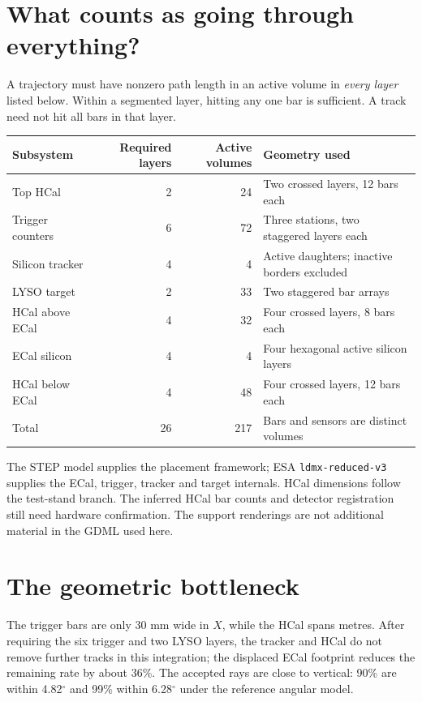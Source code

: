 \documentclass[10pt,letterpaper]{article}
\begin{document}
\section*{What counts as going through everything?}
A trajectory must have nonzero path length in an active volume in \emph{every layer} listed below. Within a segmented layer, hitting any one bar is sufficient. A track need not hit all bars in that layer.
\begin{center}
\begin{tabular}{lrrl}
\toprule
Subsystem & Required layers & Active volumes & Geometry used\\
\midrule
Top HCal & 2 & 24 & Two crossed layers, 12 bars each\\
Trigger counters & 6 & 72 & Three stations, two staggered layers each\\
Silicon tracker & 4 & 4 & Active daughters; inactive borders excluded\\
LYSO target & 2 & 33 & Two staggered bar arrays\\
HCal above ECal & 4 & 32 & Four crossed layers, 8 bars each\\
ECal silicon & 4 & 4 & Four hexagonal active silicon layers\\
HCal below ECal & 4 & 48 & Four crossed layers, 12 bars each\\
\midrule
Total & 26 & 217 & Bars and sensors are distinct volumes\\
\bottomrule
\end{tabular}
\end{center}
The STEP model supplies the placement framework; ESA \texttt{ldmx-reduced-v3} supplies the ECal, trigger, tracker and target internals. HCal dimensions follow the test-stand branch. The inferred HCal bar counts and detector registration still need hardware confirmation. The support renderings are not additional material in the GDML used here.

\section*{The geometric bottleneck}
The trigger bars are only 30 mm wide in $X$, while the HCal spans metres. After requiring the six trigger and two LYSO layers, the tracker and HCal do not remove further tracks in this integration; the displaced ECal footprint reduces the remaining rate by about 36\%. The accepted rays are close to vertical: 90\% are within 4.82$^\circ$ and 99\% within 6.28$^\circ$ under the reference angular model.
\end{document}

